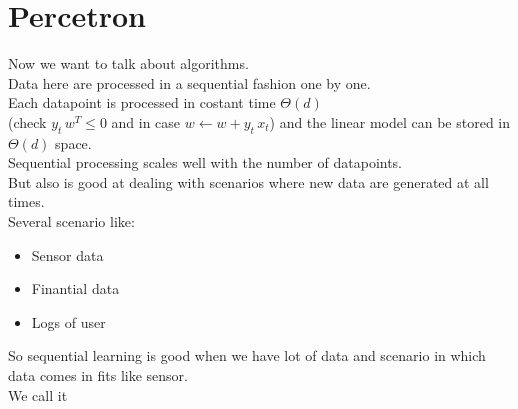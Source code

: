 \documentclass[../main.tex]{subfiles}
\begin{document}
\section{Percetron}
Now we want to talk about algorithms. \\
Data here are processed in a sequential fashion one by one.\\
Each datapoint is processed in costant time $ \Theta \left( d \right)$\\
(check $y_t \, w^T \leq 0$ and in case $ w \leftarrow w + y_t \, x_t$) 
and the linear model can be stored in $\Theta (d)$ space.
\\
Sequential processing scales well with the number of datapoints.
\\ But also is good at dealing with scenarios where new data are generated at all times.
\\ Several scenario like:
\begin{itemize}
\item Sensor data
\item Finantial data
\item Logs of user
\end{itemize}
So sequential learning is good when we have lot of data and scenario in which data comes in fits like sensor. 
\\ We call it 
\\
\end{document}
